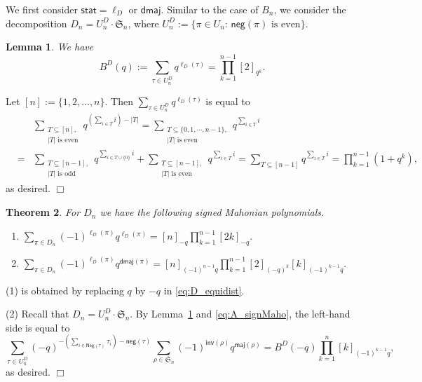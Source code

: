 \documentclass[a4paper, reqno, 11pt]{amsart}
\newtheorem{lem}{Lemma}[section]
\newtheorem{thm}[lem]{Theorem}
\newcommand{\stat}{{\textsf{stat}}}
\newcommand{\maj}{{\textsf{maj}}}
\newcommand{\inv}{{\textsf{inv}}}
\newcommand{\Nega}{{\textsf{Neg}}}
\newcommand{\nega}{{\textsf{neg}}}
\newcommand{\dmaj}{{\textsf{dmaj}}}
\numberwithin{equation}{section}
\renewcommand{\d}{\displaystyle}
\def\proof{\noindent{\bf Proof.\quad}}
\def\qed{\hspace*{\fill} $\Box$ \medskip}
\begin{document}
\medskip

We first consider $\stat=\ell_D$ or $\dmaj$.
Similar to the case of $B_n$, we consider the decomposition $D_n=U^D_n\cdot \mathfrak{S}_n$, where $U^D_n:=\{\pi\in U_n:\,\nega(\pi)\text{ is even}\}$. 






\begin{lem}\label{lem:D_stat}
We have
$$B^D(q):=\sum_{\tau\in U^D_n}q^{\ell_D(\tau)}=\prod_{k=1}^{n-1}[2]_{q^k}.$$

\end{lem}
\proof 
Let $[n]:=\{1,2,\ldots,n\}$. 
Then $\sum_{\tau\in U^D_n}q^{\ell_D(\tau)}$ is equal to
\begin{eqnarray*}
&&\sum_{\substack{T\subseteq [n],\\|T|\text{ is even}}} q^{\left(\sum_{i\in T}i\right)-|T|}
=\sum_{\substack{T\subseteq \{0,1,\cdots,n-1\},\\|T|\text{ is even}}} q^{\sum_{i\in T}i}\\
&=&\sum_{\substack{T\subseteq [n-1],\\|T|\text{ is odd}}}q^{\sum_{i\in T\cup\{0\}}i}
+\sum_{\substack{T\subseteq [n-1],\\|T|\text{ is even}}}q^{\sum_{i\in T}i}
=\sum_{T\subseteq [n-1]}q^{\sum_{i\in T}i}
=\prod_{k=1}^{n-1}(1+q^k),
\end{eqnarray*}
as desired. \qed






\begin{thm}\label{D_length&dmaj}
For $D_n$ we have the following signed Mahonian polynomials.
\begin{enumerate}
\item $\d\sum_{\pi\in D_n}(-1)^{\ell_D(\pi)}q^{\ell_D(\pi)}=[n]_{-q}\prod_{k=1}^{n-1}[2k]_{-q}.$



\item $\d\sum_{\pi\in D_n}(-1)^{\ell_D(\pi)}q^{\dmaj(\pi)}=[n]_{(-1)^{n-1}q}\prod_{k=1}^{n-1}[2]_{(-q)^k}[k]_{(-1)^{k-1}q}.$

\end{enumerate}
\end{thm}
\proof
(1) is obtained by replacing $q$ by $-q$ in \eqref{eq:D_equidist}.

(2) Recall that $D_n=U^D_n\cdot \mathfrak{S}_n$. 
By Lemma~\ref{lem:D_stat} and \eqref{eq:A_signMaho}, the left-hand side is equal to
$$\sum_{\tau\in U^D_n}(-q)^{-\left(\sum_{i\in\Nega(\tau)}\tau_i\right)-\nega(\tau)} \sum_{\rho\in \mathfrak{S}_n}(-1)^{\inv(\rho)}q^{\maj(\rho)}=B^D(-q)\prod_{k=1}^n [k]_{(-1)^{k-1}q},$$
as desired. \qed
\end{document}
